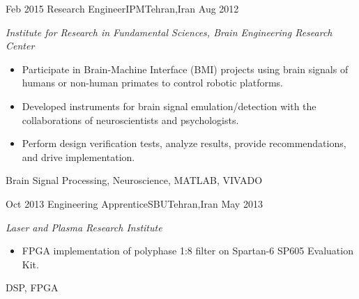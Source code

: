 \begin{experiences}
	\emptySeparator
	
	\experience
	{Feb 2015} {Research Engineer}{IPM}{Tehran,Iran}
	{Aug 2012} {
		\emph{Institute for Research in Fundamental Sciences, Brain Engineering Research Center}
		\begin{itemize}
			\item Participate in Brain-Machine Interface (BMI) projects using brain
			      signals of humans or non-human primates to control robotic platforms.
			\item Developed instruments for brain signal emulation/detection
			      with the collaborations of
			      neuroscientists and psychologists.
			\item Perform design verification tests, analyze results, provide
			      recommendations, and drive implementation.
		\end{itemize}
	}
	{Brain Signal Processing, Neuroscience, MATLAB, VIVADO}
	
	\emptySeparator
	
	\experience
	{Oct 2013} {Engineering Apprentice}{SBU}{Tehran,Iran}
	{May 2013} {
		\emph{Laser and Plasma Research Institute}
		\begin{itemize}
			\item FPGA implementation of polyphase 1:8 filter on Spartan-6 SP605 Evaluation Kit.
		\end{itemize}
	}
	{DSP, FPGA}
\end{experiences}
